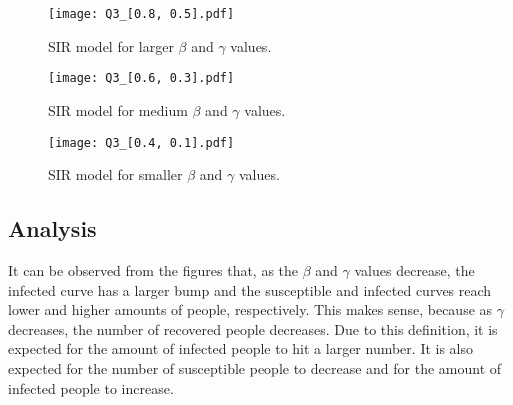 \documentclass[12pt]{article}
\begin{document}
\begin{figure}[h]
\begin{center}
\texttt{[image: Q3\_[0.8, 0.5].pdf]}
\caption{SIR model for larger $\beta$ and $\gamma$ values.}
\end{center}
\end{figure}
\begin{figure}[h]
\begin{center}
\texttt{[image: Q3\_[0.6, 0.3].pdf]}
\caption{SIR model for medium $\beta$ and $\gamma$ values.}
\end{center}
\end{figure}
\begin{figure}[h]
\begin{center}
\texttt{[image: Q3\_[0.4, 0.1].pdf]}
\caption{SIR model for smaller $\beta$ and $\gamma$ values.}
\end{center}
\end{figure}
\subsection{Analysis}
 It can be observed from the figures that, as the $\beta$ and $\gamma$ values decrease, the infected curve has a larger bump and the susceptible and infected curves reach lower and higher amounts of people, respectively. This makes sense, because as $\gamma$ decreases, the number of recovered people decreases. Due to this definition, it is expected for the amount of infected people to hit a larger number. It is also expected for the number of susceptible people to decrease and for the amount of infected people to increase.
\end{document}
